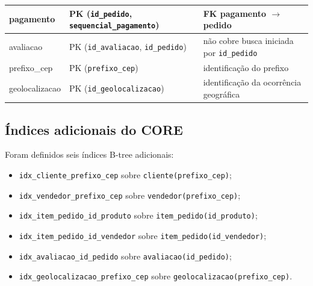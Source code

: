 \documentclass[12pt,a4paper]{article}
\begin{document}
{{\begin{longtable}{
				|>{\raggedright\arraybackslash}p{4.2cm}|
				>{\raggedright\arraybackslash}p{5cm}|
				>{\raggedright\arraybackslash}p{5cm}|
			}
			pagamento
			&
			PK (\texttt{id\_pedido}, \texttt{sequencial\_pagamento})
			&
			FK pagamento $\rightarrow$ pedido
			\\ \hline
			
			avaliacao
			&
			PK (\texttt{id\_avaliacao}, \texttt{id\_pedido})
			&
			não cobre busca iniciada por \texttt{id\_pedido}
			\\ \hline
			
			prefixo\_cep
			&
			PK (\texttt{prefixo\_cep})
			&
			identificação do prefixo
			\\ \hline
			
			geolocalizacao
			&
			PK (\texttt{id\_geolocalizacao})
			&
			identificação da ocorrência geográfica
			\\ \hline
			
		\end{longtable}
	}
	
	\subsection{Índices adicionais do CORE}
	
	Foram definidos seis índices B-tree adicionais:
	
	\begin{itemize}[leftmargin=1.2cm]
		
		\item
		\texttt{idx\_cliente\_prefixo\_cep}
		sobre \texttt{cliente(prefixo\_cep)};
		
		\item
		\texttt{idx\_vendedor\_prefixo\_cep}
		sobre \texttt{vendedor(prefixo\_cep)};
		
		\item
		\texttt{idx\_item\_pedido\_id\_produto}
		sobre \texttt{item\_pedido(id\_produto)};
		
		\item
		\texttt{idx\_item\_pedido\_id\_vendedor}
		sobre \texttt{item\_pedido(id\_vendedor)};
		
		\item
		\texttt{idx\_avaliacao\_id\_pedido}
		sobre \texttt{avaliacao(id\_pedido)};
		
		\item
		\texttt{idx\_geolocalizacao\_prefixo\_cep}
		sobre \texttt{geolocalizacao(prefixo\_cep)}.
		
	\end{itemize}
	
}
\end{document}

